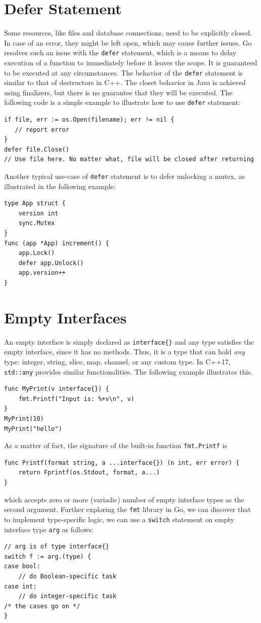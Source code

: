\documentclass[11pt]{article}
\begin{document}
\section{Defer Statement}
\label{sec:orgheadline12}
Some resources, like files and database connections, need to be explicitly closed. In case of an error, they might be left open, which may cause further issues. Go resolves such an issue with the \texttt{defer} statement, which is a means to delay execution of a function to immediately before it leaves the scope. It is guaranteed to be executed at any circumstances. The behavior of the \texttt{defer} statement is similar to that of destructors in C++. The closet behavior in Java is achieved using finalizers, but there is no guarantee that they will be executed. The following code is a simple example to illustrate how to use \texttt{defer} statement:
\begin{verbatim}
if file, err := os.Open(filename); err != nil {
   // report error
}
defer file.Close()
// Use file here. No matter what, file will be closed after returning
\end{verbatim}
Another typical use-case of \texttt{defer} statement is to defer unlocking a mutex, as illustrated in the following example:
\begin{verbatim}
type App struct {
    version int
    sync.Mutex
}
func (app *App) increment() {
    app.Lock()
    defer app.Unlock()
    app.version++
}
\end{verbatim}
\section{Empty Interfaces}
\label{sec:orgheadline13}
An empty interface is simply declared as \texttt{interface\{\}} and any type satisfies the empty interface, since it has no methods. Thus, it is a type that can hold \emph{any} type: integer, string, slice, map, channel, or any custom type. In C++17, \texttt{std::any} provides similar functionalities. The following example illustrates this.
\begin{verbatim}
func MyPrint(v interface{}) {
    fmt.Printf("Input is: %+v\n", v)
}
MyPrint(10)
MyPrint("hello")
\end{verbatim}
As a matter of fact, the signature of the built-in function \texttt{fmt.Printf} is
\begin{verbatim}
func Printf(format string, a ...interface{}) (n int, err error) {
    return Fprintf(os.Stdout, format, a...)
}
\end{verbatim}
which accepts zero or more (variadic) number of empty interface types as the second argument. Further exploring the \texttt{fmt} library in Go, we can discover that to implement type-specific logic, we can use a \texttt{switch} statement on empty interface type \texttt{arg} as follows:
\begin{verbatim}
// arg is of type interface{}
switch f := arg.(type) {
case bool:
    // do Boolean-specific task
case int:
    // do integer-specific task
/* the cases go on */
}
\end{verbatim}
\end{document}
